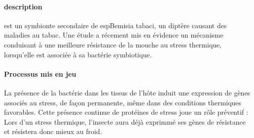 \paragraph{description} %
\label{par:description_whitefly}

 est un symbionte secondaire de esp{Bemisia tabaci}, un
diptère causant des maladies au tabac. Une étude \cite{brumin2011} a récement
mis en évidence un mécanisme conduisant à une meilleure résistance de la
mouche au stress thermique, lorsqu'elle est associée à sa bactérie
symbiotique.

\paragraph{Processus mis en jeu} %
\label{par:process_whitefly}

La présence de la bactérie dans les tissus de l'hôte induit une expression de
gènes associés au stress, de façon permanente, même dans des conditions
thermiques favorables. Cette présence continue de protéines de stress joue un
rôle préventif : Lors d'un stress thermique, l'insecte aura déjà exprimmé ses
gènes de résistance et résistera donc mieux au froid.
